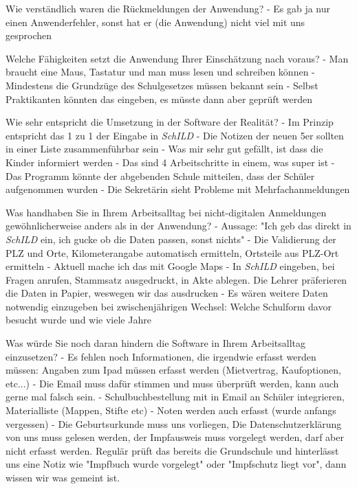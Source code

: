 Wie verständlich waren die Rückmeldungen der Anwendung?
- Es gab ja nur einen Anwenderfehler, sonst hat er (die Anwendung) nicht viel mit uns gesprochen			









Welche Fähigkeiten setzt die Anwendung Ihrer Einschätzung nach voraus?	
- Man braucht eine Maus, Tastatur und man muss lesen und schreiben können
- Mindestens die Grundzüge des Schulgesetzes müssen bekannt sein
- Selbst Praktikanten könnten das eingeben, es müsste dann aber geprüft werden

Wie sehr entspricht die Umsetzung in der Software der Realität? 
- Im Prinzip entspricht das 1 zu 1 der Eingabe in  \textit{SchILD} 
- Die Notizen der neuen 5er sollten in einer Liste zusammenführbar sein
- Was mir sehr gut gefällt, ist dass die Kinder informiert werden
- Das sind 4 Arbeitschritte in einem, was super ist
- Das Programm könnte der abgebenden Schule mitteilen, dass der Schüler aufgenommen wurden
- Die Sekretärin sieht Probleme mit Mehrfachanmeldungen	






Was handhaben Sie in Ihrem Arbeitsalltag bei nicht-digitalen Anmeldungen gewöhnlicherweise anders als in der Anwendung?
- Aussage: "Ich geb das direkt in \textit{SchILD} ein, ich gucke ob die Daten passen, sonst nichts"
- Die Validierung der PLZ und Orte, Kilometerangabe automatisch ermitteln, Ortsteile aus PLZ-Ort ermitteln
 - Aktuell mache ich das mit Google Maps
- In \textit{SchILD} eingeben, bei Fragen anrufen, Stammsatz ausgedruckt, in Akte ablegen. Die Lehrer präferieren die Daten in Papier, weswegen wir das ausdrucken
- Es wären weitere Daten notwendig einzugeben bei zwischenjährigen Wechsel: Welche Schulform davor besucht wurde und wie viele Jahre








Was würde Sie noch daran hindern die Software in Ihrem Arbeitsalltag einzusetzen?
- Es fehlen noch Informationen, die irgendwie erfasst werden müssen: Angaben zum Ipad müssen erfasst werden (Mietvertrag, Kaufoptionen, etc...)
- Die Email muss dafür stimmen und muss überprüft werden, kann auch gerne mal falsch sein.
- Schulbuchbestellung mit in Email an Schüler integrieren, Materialliste (Mappen, Stifte etc)
- Noten werden auch erfasst (wurde anfangs vergessen)			
- Die Geburtsurkunde muss uns vorliegen, Die Datenschutzerklärung von uns muss gelesen werden, der Impfausweis muss vorgelegt werden, darf aber nicht erfasst werden. Regulär prüft das bereits die Grundschule und hinterlässt uns eine Notiz wie "Impfbuch wurde vorgelegt" oder "Impfschutz liegt vor", dann wissen wir was gemeint ist. 





